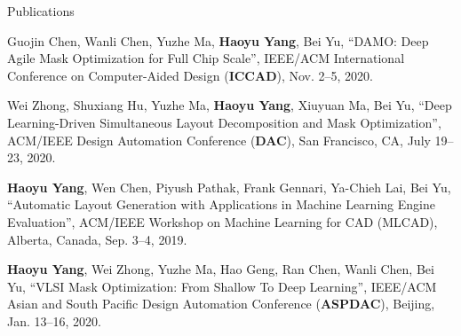 \begin{rSection}{Publications}
\begin{description}[font=\normalfont]
    \item[{[C16]}] Guojin Chen, Wanli Chen, Yuzhe Ma, \textbf{Haoyu Yang}, Bei Yu,
     ``DAMO: Deep Agile Mask Optimization for Full Chip Scale'', 
     IEEE/ACM International Conference on Computer-Aided Design (\textbf{ICCAD}), Nov. 2–5, 2020.
	
	\item[{[C15]}] Wei Zhong, Shuxiang Hu, Yuzhe Ma, \textbf{Haoyu Yang}, Xiuyuan Ma, Bei Yu, 
	``Deep Learning-Driven Simultaneous Layout Decomposition and Mask Optimization'', 
	ACM/IEEE Design Automation Conference (\textbf{DAC}), San Francisco, CA, July 19–23, 2020.
	
	\item[{[C14]}] \textbf{Haoyu Yang}, Wen Chen, Piyush Pathak, Frank Gennari, Ya-Chieh Lai, Bei Yu, 
	``Automatic Layout Generation with Applications in Machine Learning Engine Evaluation'', 
	ACM/IEEE Workshop on Machine Learning for CAD (MLCAD), Alberta, Canada, Sep. 3–4, 2019.
	
	
	\item[{[C13]}] \textbf{Haoyu Yang}, Wei Zhong, Yuzhe Ma, Hao Geng, Ran Chen, Wanli Chen, Bei Yu,
	 ``VLSI Mask Optimization: From Shallow To Deep Learning'', 
	 IEEE/ACM Asian and South Pacific Design Automation Conference (\textbf{ASPDAC}), Beijing, Jan. 13–16, 2020.


\end{description}
\end{rSection}

